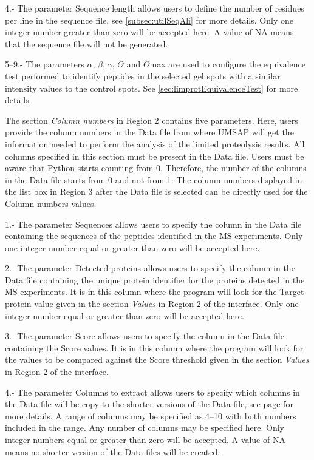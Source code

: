 \num{4}.- The parameter Sequence length\label{par:limprotSeqL} allows users to define the number of residues per line in the sequence file, see \autoref{subsec:utilSeqAli} for more details. Only one integer number greater than zero will be accepted here. A value of NA means that the sequence file will not be generated.

\numrange[range-phrase = --]{5}{9}.- The parameters $\alpha$, $\beta$, $\gamma$, $\Theta$ and $\Theta$max are used to configure the equivalence test\cite{Limentani2005} performed to identify peptides in the selected gel spots with a similar intensity values to the control spots. See \autoref{sec:limprotEquivalenceTest} for more details.

The section \textit{Column numbers} in Region \num{2} contains five parameters. Here, users provide the column numbers in the Data file from where UMSAP will get the information needed to perform the analysis of the limited proteolysis results. All columns specified in this section must be present in the Data file. Users must be aware that Python starts counting from \num{0}. Therefore, the number of the columns in the Data file starts from \num{0} and not from \num{1}. The column numbers displayed in the list box in Region \num{3} after the Data file is selected can be directly used for the Column numbers values.  

\num{1}.- The parameter Sequences allows users to specify the column in the Data file containing the sequences of the peptides identified in the MS experiments. Only one integer number equal or greater than zero will be accepted here.

\num{2}.- The parameter Detected proteins allows users to specify the column in the Data file containing the unique protein identifier for the proteins detected in the MS experiments. It is in this column where the program will look for the Target protein value given in the section \textit{Values} in Region \num{2} of the interface. Only one integer number equal or greater than zero will be accepted here.

\num{3}.- The parameter Score allows users to specify the column in the Data file containing the Score values. It is in this column where the program will look for the values to be compared against the Score threshold given in the section \textit{Values} in Region \num{2} of the interface.

\num{4}.- The parameter Columns to extract\label{par:limprotColumnExtract} allows users to specify which columns in the Data file will be copy to the shorter versions of the Data file, see page \pageref{subsec:utilShortDF} for more details. A range of columns may be specified as \numrange[range-phrase = --]{4}{10} with both numbers included in the range. Any number of columns may be specified here. Only integer numbers equal or greater than zero will be accepted. A value of NA means no shorter version of the Data files will be created.

